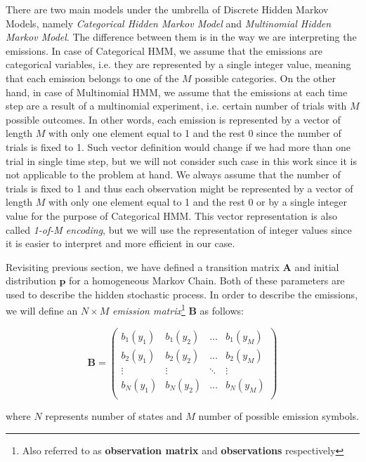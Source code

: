 There are two main models under the umbrella of Discrete Hidden Markov Models, namely \textit{Categorical Hidden Markov Model} and \textit{Multinomial Hidden Markov Model}. The difference between them 
is in the way we are interpreting the emissions. In case of Categorical HMM, we assume that the emissions are categorical variables, i.e. they are represented by a single integer value,
meaning that each emission belongs to one of the $M$ possible categories. On the other hand, in case of Multinomial HMM, we assume that the emissions at each time step are a result of a multinomial experiment,
i.e. certain number of trials with $M$ possible outcomes. In other words, each emission is represented by a vector of length $M$ with only one element equal to 1 and the rest 0 since the number of trials is fixed to 1.
Such vector definition would change if we had more than one trial in single time step, but we will not consider such case in this work since it is not applicable to the problem at hand. We always assume that the number of trials is fixed to 1
and thus each observation might be represented by a vector of length $M$ with only one element equal to 1 and the rest 0 or by a single integer value for the purpose of Categorical HMM. This vector representation is also called \textit{1-of-M encoding}, but 
we will use the representation of integer values since it is easier to interpret and more efficient in our case.

Revisiting previous section, we have defined a transition matrix $\textbf{A}$ and initial distribution $\textbf{p}$ for a homogeneous Markov Chain. Both of these parameters are used to describe the hidden stochastic process.
In order to describe the emissions, we will define an $N \times M$ \textit{emission matrix}\footnote{Also referred to as \textbf{observation matrix} and \textbf{observations} respectively} $\textbf{B}$ as follows:

\begin{equation}
    \textbf{B} = \begin{pmatrix}
    b_1(y_1) & b_1(y_2) & \ldots & b_1(y_M) \\
    b_2(y_1) & b_2(y_2) & \ldots & b_2(y_M) \\
    \vdots & \vdots & \ddots & \vdots \\
    b_N(y_1) & b_N(y_2) & \ldots & b_N(y_M) \\
    \end{pmatrix}
\end{equation}

\noindent where $N$ represents number of states and $M$ number of possible emission symbols.

